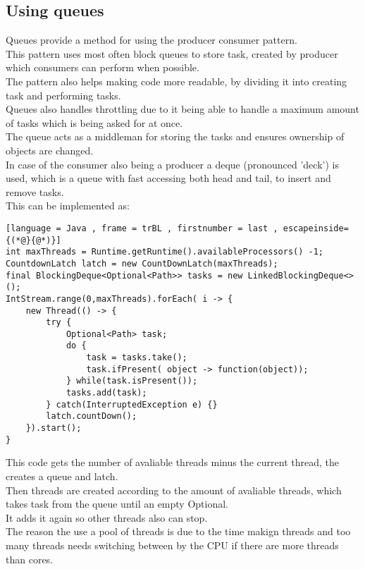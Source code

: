 \documentclass[12pt, a4paper]{article}
\begin{document}
		\subsection{Using queues}
			Queues provide a method for using the producer consumer pattern.\\
			This pattern uses most often block queues to store task, created by producer which consumers can perform when possible.\\
			The pattern also helps making code more readable, by dividing it into creating task and performing tasks.\\
			Queues also handles throttling due to it being able to handle a maximum amount of tasks which is being asked for at once.\\
			The queue acts as a middleman for storing the tasks and ensures ownership of objects are changed.\\
			In case of the consumer also being a producer a deque (pronounced 'deck') is used, which is a queue with fast accessing both head and tail, to insert and remove tasks.\\
			This can be implemented as:
	\begin{lstlisting}[language = Java , frame = trBL , firstnumber = last , escapeinside={(*@}{@*)}]
int maxThreads = Runtime.getRuntime().availableProcessors() -1;
CountdownLatch latch = new CountDownLatch(maxThreads);
final BlockingDeque<Optional<Path>> tasks = new LinkedBlockingDeque<>();
IntStream.range(0,maxThreads).forEach( i -> {
	new Thread(() -> {
		try {
			Optional<Path> task;
			do {
				task = tasks.take();
				task.ifPresent( object -> function(object));
			} while(task.isPresent());
			tasks.add(task);
		} catch(InterruptedException e) {}
		latch.countDown();
	}).start();
}
\end{lstlisting}
			This code gets the number of avaliable threads minus the current thread, the creates a queue and latch.\\
			Then threads are created according to the amount of avaliable threads, which takes task from the queue until an empty Optional.\\
			It adds it again so other threads also can stop.\\
			The reason the use a pool of threads is due to the time makign threads and too many threads needs switching between by the CPU if there are more threads than cores.\\
\end{document}
